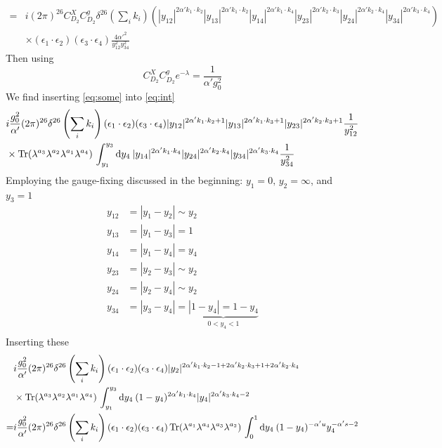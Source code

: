 \documentclass[a4paper,10pt]{article}
\renewcommand\[{\begin{equation*}}
\renewcommand\]{\end{equation*}}
\numberwithin{equation}{section}
\begin{document}
\begin{equation}\label{eq:some}
\begin{aligned}
=&i(2\pi)^{26}C_{D_2}^X C_{D_2}^g\delta^{26}\left(\sum_ik_i\right)\left(|y_{12}|^{2\alpha' k_1\cdot k_2}|y_{13}|^{2\alpha' k_1\cdot k_2}|y_{14}|^{2\alpha' k_1\cdot k_4}|y_{23}|^{2\alpha' k_2\cdot k_3}|y_{24}|^{2\alpha' k_2\cdot k_4}|y_{34}|^{2\alpha' k_3\cdot k_4}\right)\\
&\times(\epsilon_{1}\cdot \epsilon_{2})(\epsilon_{3}\cdot \epsilon_{4})\frac{4\alpha'^2}{y_{12}^2y_{34}^2}
\end{aligned}
\end{equation}
Then using
\begin{equation}
C_{D_2}^X C^{g}_{D_2}e^{-\lambda }=\frac{1}{\alpha' g_0^2}
\end{equation}
We find inserting \eqref{eq:some} into \eqref{eq:int} 
\begin{equation} \label{eq:genform}
\begin{aligned}
&i\frac{g_0^2}{\alpha'}(2\pi)^{26}\delta^{26}\left(\sum_ik_i\right)(\epsilon_{1}\cdot \epsilon_{2})(\epsilon_{3}\cdot \epsilon_{4})
|y_{12}|^{2\alpha' k_1\cdot k_2+1}|y_{13}|^{2\alpha' k_1\cdot k_3+1}|y_{23}|^{2\alpha' k_2\cdot k_3+1}\frac{1}{y_{12}^2}\\
&\times \Tr(\lambda^{a_3}\lambda^{a_2}\lambda^{a_1}\lambda^{a_4})\,\int_{y_1}^{y_3} \dd y_4\:|y_{14}|^{2\alpha' k_1\cdot k_4}|y_{24}|^{2\alpha' k_2\cdot k_4}|y_{34}|^{2\alpha' k_3\cdot k_4} \frac{1}{y_{34}^2}
\end{aligned}
\end{equation}
Employing the gauge-fixing discussed in the beginning: $y_1=0,\,y_2=\infty$, and $y_3=1$
\begin{equation}
\begin{aligned}
y_{12}&=|y_1-y_2|\sim y_2\\
y_{13}&=|y_1-y_3|= 1\\
y_{14}&=|y_1-y_4|=y_4\\
y_{23}&=|y_2-y_3|\sim y_2\\
y_{24}&=|y_2-y_4|\sim y_2\\
y_{34}&=|y_3-y_4|=\underbrace{|1-y_4|=1-y_4}_{0<y_4<1}\\
\end{aligned}
\end{equation}
Inserting these
\begin{equation}
\begin{aligned}
&i\frac{g_0^2}{\alpha'}(2\pi)^{26}\delta^{26}\left(\sum_ik_i\right)(\epsilon_{1}\cdot \epsilon_{2})(\epsilon_{3}\cdot \epsilon_{4})
|y_{2}|^{2\alpha' k_1\cdot k_2-1+2\alpha'k_2\cdot k_3+1+2\alpha' k_2\cdot k_4}\\
&\times \Tr(\lambda^{a_3}\lambda^{a_2}\lambda^{a_1}\lambda^{a_4})\,\int_{y_1}^{y_3} \dd y_4\:(1-y_4)^{2\alpha' k_1\cdot k_4}|y_{4}|^{2\alpha' k_3\cdot k_4-2}\\
=&
i\frac{g_0^2}{\alpha'}(2\pi)^{26}\delta^{26}\left(\sum_ik_i\right)(\epsilon_{1}\cdot \epsilon_{2})(\epsilon_{3}\cdot \epsilon_{4})\Tr(\lambda^{a_1}\lambda^{a_4}\lambda^{a_3}\lambda^{a_2})\,\int_{0}^{1} \dd y_4\:(1-y_4)^{-\alpha' u}y_{4}^{-\alpha's-2}\\
\end{aligned}
\end{equation}
\end{document}
